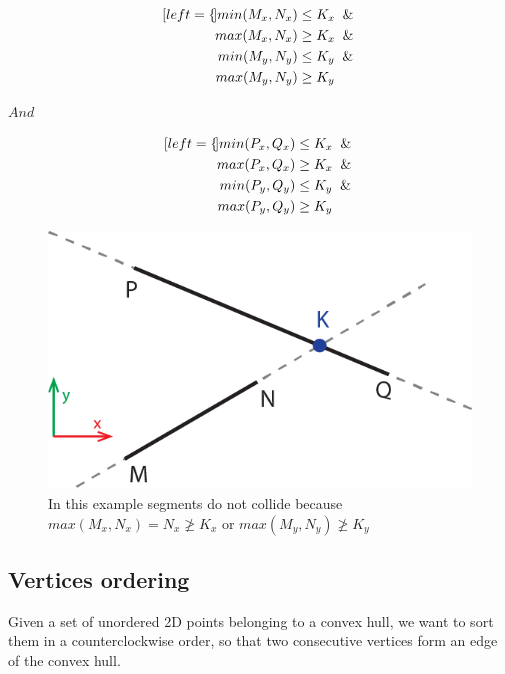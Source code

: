 \documentclass{PoliMi_MasterThesis}
\begin{document}
\begin{minipage}{.4\linewidth}
	\begin{subequations}
		\begin{align*}[left=\empheqlbrace]
			min(M_x, N_x) &\leq K_x \And\\
			max(M_x, N_x) &\geq K_x \And\\
			min(M_y, N_y) &\leq K_y \And\\
			max(M_y, N_y) &\geq K_y		
		\end{align*}
	\end{subequations}
\end{minipage}
		$And$
\begin{minipage}{.4\linewidth}
	\begin{subequations}
		\begin{align*}[left=\empheqlbrace]
			min(P_x, Q_x) &\leq K_x \And\\
			max(P_x, Q_x) &\geq K_x \And\\
			min(P_y, Q_y) &\leq K_y \And\\
			max(P_y, Q_y) &\geq K_y		
		\end{align*}
	\end{subequations}
\end{minipage}

\begin{figure}[H]
    \centering
    \includegraphics[scale=0.4]{Images/segments_intersection.png} 
    \caption{In this example segments do not collide because $max(M_x, N_x) = N_x \ngeq K_x$ or $max(M_y, N_y) \ngeq K_y$}
    \label{fig:segments_intersection}
\end{figure}

\subsection{Vertices ordering}
Given a set of unordered 2D points belonging to a convex hull, we want to sort them in a counterclockwise order, so that two consecutive vertices form an edge of the convex hull.
\end{document}
